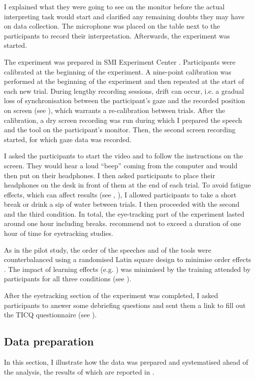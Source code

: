 I explained what they were going to see on the monitor before the actual interpreting task would start and clarified any remaining doubts they may have on data collection. The microphone was placed on the table next to the participants to record their interpretation. Afterwards, the experiment was started.

The experiment was prepared in SMI Experiment Center \citep{SMIexpcenter}. Participants were calibrated at the beginning of the experiment. A nine-point calibration was performed at the beginning of the experiment and then repeated at the start of each new trial. During lengthy recording sessions, drift can occur, i.e. a gradual loss of synchronisation between the participant's gaze and the recorded position on screen (see \citealt[210]{hvelplund_eye_2014}), which warrants a re-calibration between trials. After the calibration, a dry screen recording was run during which I prepared the speech and the tool on the participant's monitor. Then, the second screen recording started, for which gaze data was recorded.

I asked the participants to start the video and to follow the instructions on the screen. They would hear a loud ``beep'' coming from the computer and would then put on their headphones. I then asked participants to place their headphones on the desk in front of them at the end of each trial. To avoid fatigue effects, which can affect results (see \citealt[400]{spinner_ecological_2013}, \citealt[18]{keating_experimental_2015}), I allowed participants to take a short break or drink a sip of water between trials. I then proceeded with the second and the third condition. In total, the eye-tracking part of the experiment lasted around one hour including breaks. \citet{conklin_eye-tracking_2018} recommend not to exceed a duration of one hour of time for eyetracking studies.

As in the pilot study, the order of the speeches and of the tools were counterbalanced using a randomised Latin square design to minimise order effects \citep[42--43]{conklin_eye-tracking_2018}. The impact of learning effects (e.g. \citealt[65]{lazar_research_2017}) was minimised by the training attended by participants for all three conditions (see ).\largerpage

After the eyetracking section of the experiment was completed, I asked participants to answer some debriefing questions and sent them a link to fill out the TICQ questionnaire (see ).
\subsection{Data preparation} \label{data_prep}
In this section, I illustrate how the data was prepared and systematised ahead of the analysis, the results of which are reported in .

